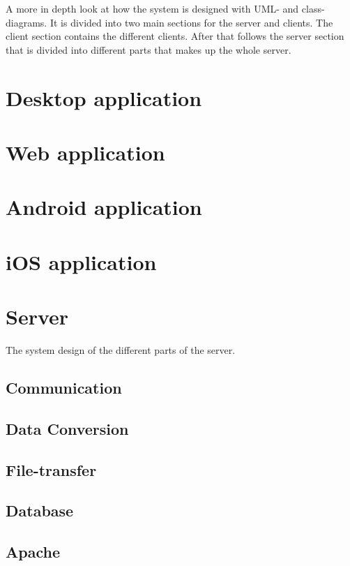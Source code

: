 
A more in depth look at how the system is designed with UML- and class-diagrams. It is divided into two main sections for the server and clients. The client section contains the different clients. After that follows the server section that is divided into different parts that makes up the whole server. 

\section{Desktop application}

\FloatBarrier

\section{Web application}


\FloatBarrier

\section{Android application}

\FloatBarrier

\section{iOS application}

\FloatBarrier

\section{Server}
The system design of the different parts of the server.
\subsection{Communication}

\FloatBarrier
\subsection{Data Conversion}

\FloatBarrier
\subsection{File-transfer}

\FloatBarrier
\subsection{Database}

\FloatBarrier
\subsection{Apache}

\FloatBarrier

